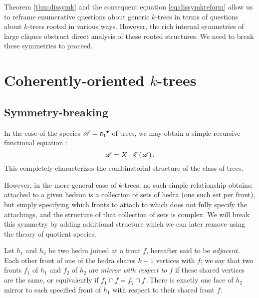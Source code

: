 \documentclass[distribution,draft]{brandiss} %
\numberwithin{section}{chapter}
\numberwithin{figure}{chapter}
\begin{document}
Theorem \ref{thm:dissymk} and the consequent equation \eqref{eq:dissymkreform} allow us to reframe enumerative questions about generic $k$-trees in terms of questions about $k$-trees rooted in various ways.
However, the rich internal symmetries of large cliques obstruct direct analysis of these rooted structures.
We need to break these symmetries to proceed.

\section{Coherently-oriented $k$-trees}
\subsection{Symmetry-breaking}\label{ss:symbreak}
In the case of the species $\mathscr{A} =  {\mathfrak{a}_{1}^{}}^{\bullet } $ of trees, we may obtain a simple recursive functional equation \cite[\S 1, eq.~(9)]{bll:species}:
\begin{equation}
  \label{eq:rtrees}
  \mathscr{A} = X \cdot \mathscr{E} \left( {\mathscr{A}} \right).
\end{equation}
This completely characterizes the combinatorial structure of the class of trees.

However, in the more general case of $k$-trees, no such simple relationship obtains; attached to a given hedron is a collection of sets of hedra (one such set per front), but simply specifying which fronts to attach to which does not fully specify the attachings, and the structure of that collection of sets is complex.
We will break this symmetry by adding additional structure which we can later remove using the theory of quotient species.

\begin{definition}
  \label{def:mirrorfronts}
  Let $h_{1}$ and $h_{2}$ be two hedra joined at a front $f$, hereafter said to be \emph{adjacent}.
  Each other front of one of the hedra shares $k-1$ vertices with $f$; we say that two fronts $f_{1}$ of $h_{1}$ and $f_{2}$ of $h_{2}$ are \emph{mirror with respect to $f$} if these shared vertices are the same, or equivalently if $f_{1} \cap f = f_{2} \cap f$.
  There is exactly one face of $h_{2}$ mirror to each specified front of $h_{1}$ with respect to their shared front $f$.
\end{definition}

\begin{comment} Don't think we need this after all...
  \begin{definition}\label{def:cycord}
    For a set $A$, define a \emph{cyclic order of $A$} to be a labeling of the cyclic digraph $\overrightarrow{C}_{\abs{A}}$ by $A$ and let $\cyc A$ be the set of such linear orders. Let $\lin A$ be the set of linear orders on $A$. Let $\psi_{A}: \lin A \to \cyc A$ (hereafter denoted simply $\psi$ when the set is unambiguous) send each linear order $\ell$ to the cyclic order obtained by decorating $\overrightarrow{C}_{\abs{A}}$ with $\ell$ in order. (Note that this map is $\abs{A}$-to-one.) Then a \emph{linearization} of a given cyclic order $c \in \cyc A$ is an element of $\psi^{-1} \pbrac{c}$.
  \end{definition}
\end{comment}
\end{document}
